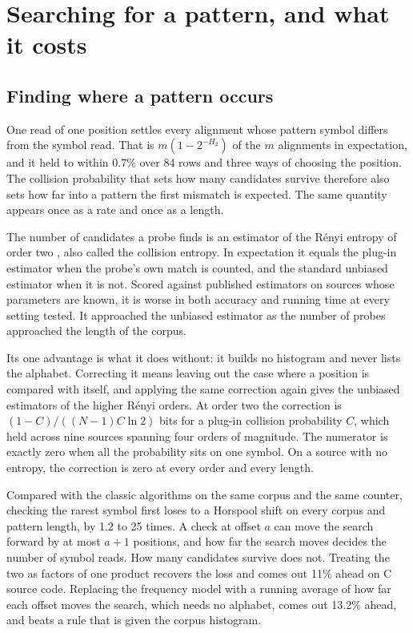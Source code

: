 \chapter{Searching for a pattern, and what it costs}

\section{Finding where a pattern occurs}

One read of one position settles every alignment whose pattern symbol differs from the symbol read. That is \(m(1-2^{-H_2})\) of the \(m\) alignments in expectation, and it held to within 0.7\% over 84 rows and three ways of choosing the position. The collision probability that sets how many candidates survive therefore also sets how far into a pattern the first mismatch is expected. The same quantity appears once as a rate and once as a length.

The number of candidates a probe finds is an estimator of the R\'enyi entropy of order two \cite{src:Renyi}, also called the collision entropy. In expectation it equals the plug-in estimator when the probe's own match is counted, and the standard unbiased estimator when it is not. Scored against published estimators on sources whose parameters are known, it is worse in both accuracy and running time at every setting tested. It approached the unbiased estimator as the number of probes approached the length of the corpus.

Its one advantage is what it does without: it builds no histogram and never lists the alphabet. Correcting it means leaving out the case where a position is compared with itself, and applying the same correction again gives the unbiased estimators of the higher R\'enyi orders. At order two the correction is \((1-C)/((N-1)C\ln 2)\) bits for a plug-in collision probability \(C\), which held across nine sources spanning four orders of magnitude. The numerator is exactly zero when all the probability sits on one symbol. On a source with no entropy, the correction is zero at every order and every length.

Compared with the classic algorithms on the same corpus and the same counter, checking the rarest symbol first loses to a Horspool shift \cite{src:Horspool} on every corpus and pattern length, by 1.2 to 25 times. A check at offset \(a\) can move the search forward by at most \(a+1\) positions, and how far the search moves decides the number of symbol reads. How many candidates survive does not. Treating the two as factors of one product recovers the loss and comes out 11\% ahead on C source code. Replacing the frequency model with a running average of how far each offset moves the search, which needs no alphabet, comes out 13.2\% ahead, and beats a rule that is given the corpus histogram.

